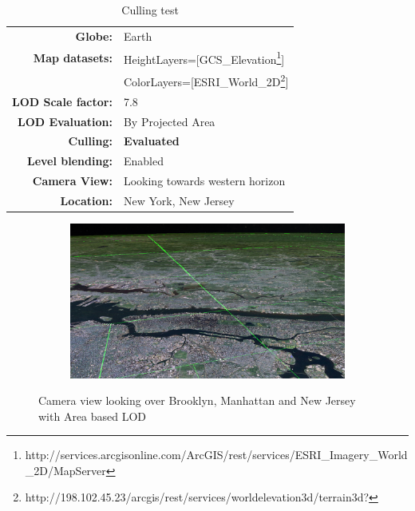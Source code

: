 \begin{table}[h]
  \centering
  \caption[]{Culling test}
    \label{table:cullingd}
  \begin{tabular}{| r l |}
    \hline
      \textbf{Globe:}             & Earth \\
      \textbf{Map datasets:}      & HeightLayers=[GCS\_Elevation\footnote{http://services.arcgisonline.com/ArcGIS/rest/services/ESRI\_Imagery\_World\_2D/MapServer}] \\
                                  & ColorLayers=[ESRI\_World\_2D\footnote{http://198.102.45.23/arcgis/rest/services/worldelevation3d/terrain3d?}] \\
      \textbf{LOD Scale factor:}  & 7.8 \\
      \textbf{LOD Evaluation:}    & By Projected Area \\
      \textbf{Culling:}           & \textbf{Evaluated} \\
      \textbf{Level blending:}    & Enabled \\
      \textbf{Camera View:}       & Looking towards western horizon\\
      \textbf{Location:}          & New York, New Jersey\\
    \hline
  \end{tabular}
\end{table}

\begin{figure}[h]
    \centering
    \begin{subfigure}[bt]{1.0\textwidth}
        \includegraphics[width=\textwidth]{figures/results/culling/cam_a.png}
    \end{subfigure}
    \caption{Camera view looking over Brooklyn, Manhattan and New Jersey with Area based LOD}
    \label{fig:cullingacam}
\end{figure}

